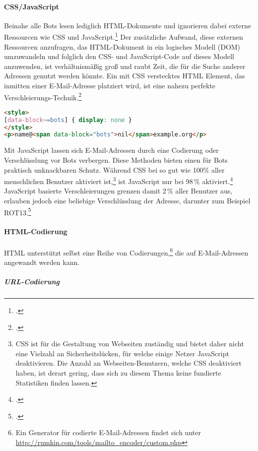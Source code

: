 \paragraph{CSS/JavaScript}
\label{par:cssjavascript}

Beinahe alle Bots lesen lediglich HTML-Dokumente und ignorieren dabei externe
Ressourcen wie CSS und JavaScript.\footcite{hideEmailAddress} Der zusätzliche
Aufwand, diese externen Ressourcen anzufragen, das HTML-Dokument in ein
logisches Modell (DOM) umzuwandeln und folglich den CSS- und JavaScript-Code
auf dieses Modell anzuwenden, ist verhältnismäßig groß und raubt Zeit, die für
die Suche anderer Adressen genutzt werden könnte. Ein mit CSS verstecktes HTML
Element, das inmitten einer E-Mail-Adresse platziert wird, ist eine nahezu
perfekte Verschleierungs-Technik.\footcite{obfuscateEmailAddresses}

\begin{lstlisting}[language=HTML]
<style>
[data-block~=bots] { display: none }
</style>
<p>name@<span data-block="bots">nil</span>example.org</p>
\end{lstlisting}

Mit JavaScript lassen sich E-Mail-Adressen durch eine Codierung oder
Verschlüsslung vor Bots verbergen. Diese Methoden bieten einen für Bots
praktisch unknackbaren Schutz. Während CSS bei so gut wie 100\% aller
menschlichen Benutzer aktiviert ist,\footnote{CSS ist für die Gestaltung von
Webseiten zuständig und bietet daher nicht eine Vielzahl an Sicherheitslücken,
für welche einige Netzer JavaScript deaktivieren. Die Anzahl an
Webseiten-Benutzern, welche CSS deaktiviert haben, ist derart gering, dass sich
zu diesem Thema keine fundierte Statistiken finden lassen.} ist JavaScript nur
bei 98\,\% aktiviert.\footcite{javaScriptDisableStats} JavaScript basierte
Verschleierungen grenzen damit 2\,\% aller Benutzer aus, erlauben jedoch eine
beliebige Verschlüsslung der Adresse, darunter zum Beispiel
ROT13.\footcite{modernCryptanalysis}

\paragraph{HTML-Codierung}
\label{par:html-codierung}

HTML unterstützt selbst eine Reihe von Codierungen,\footnote{Ein Generator für
codierte E-Mail-Adressen findet sich unter
\url{http://rumkin.com/tools/mailto_encoder/custom.php}} die auf
E-Mail-Adressen angewandt werden kann.

\subparagraph{URL-Codierung}
\label{spar:url-codierung}

